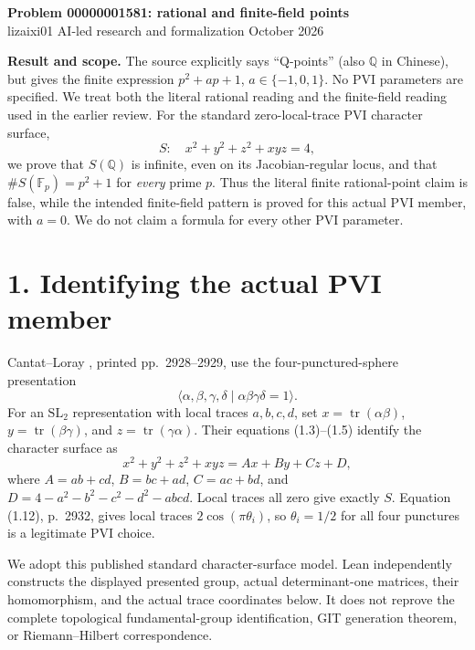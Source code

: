 \documentclass[10pt]{article}
\begin{document}
\begin{center}
{\Large\bfseries Problem 00000001581: rational and finite-field points}\\[5pt]
lizaixi01 \quad AI-led research and formalization  October 2026
\end{center}
\setlength{\abovedisplayskip}{6pt}
\setlength{\belowdisplayskip}{6pt}

\textbf{Result and scope.} The source explicitly says ``Q-points'' (also $\mathbb Q$ in Chinese), but gives the finite expression $p^2+ap+1$, $a\in\{-1,0,1\}$. No PVI parameters are specified. We treat both the literal rational reading and the finite-field reading used in the earlier review. For the standard zero-local-trace PVI character surface,
\[
 S:\quad x^2+y^2+z^2+xyz=4,
\]
we prove that $S(\mathbb Q)$ is infinite, even on its Jacobian-regular locus, and that $\#S(\mathbb F_p)=p^2+1$ for \emph{every} prime $p$. Thus the literal finite rational-point claim is false, while the intended finite-field pattern is proved for this actual PVI member, with $a=0$. We do not claim a formula for every other PVI parameter.

\section*{1. Identifying the actual PVI member}
Cantat--Loray \cite{CL}, printed pp.~2928--2929, use the four-punctured-sphere presentation
\[
 \langle\alpha,\beta,\gamma,\delta\mid\alpha\beta\gamma\delta=1\rangle.
\]
For an $\mathrm{SL}_2$ representation with local traces $a,b,c,d$, set
$x=\operatorname{tr}(\alpha\beta)$, $y=\operatorname{tr}(\beta\gamma)$, and $z=\operatorname{tr}(\gamma\alpha)$. Their equations (1.3)--(1.5) identify the character surface as
\[
 x^2+y^2+z^2+xyz=Ax+By+Cz+D,
\]
where $A=ab+cd$, $B=bc+ad$, $C=ac+bd$, and
$D=4-a^2-b^2-c^2-d^2-abcd$. Local traces all zero give exactly $S$. Equation (1.12), p.~2932, gives local traces $2\cos(\pi\theta_i)$, so $\theta_i=1/2$ for all four punctures is a legitimate PVI choice.

We adopt this published standard character-surface model. Lean independently constructs the displayed presented group, actual determinant-one matrices, their homomorphism, and the actual trace coordinates below. It does not reprove the complete topological fundamental-group identification, GIT generation theorem, or Riemann--Hilbert correspondence.
\end{document}
